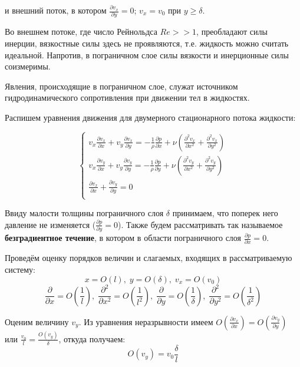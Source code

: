 и внешний поток, в котором $\frac{\partial v_x}{\partial y} = 0$; $v_x = v_0$ при $y \geq \delta$.

\bigskip
Во внешнем потоке, где число Рейнольдса $Re >> 1$, преобладают силы инерции, вязкостные силы здесь не проявляются, т.е. жидкость можно считать идеальной. Напротив, в пограничном слое силы вязкости и инерционные силы соизмеримы.

Явления, происходящие в пограничном слое, служат источником гидродинамического сопротивления при движении тел в жидкостях.

\bigskip
Распишем уравнения движения для двумерного стационарного потока жидкости:

\begin{equation}
  \begin{cases}
    v_x\frac{\partial v_x}{\partial x} + v_y\frac{\partial v_x}{\partial y} = -\frac{1}{\rho} \frac{\partial p}{\partial x} + \nu (\frac{\partial^2 v_x}{\partial x^2} + \frac{\partial^2 v_x}{\partial y^2}) \\

    v_x\frac{\partial v_y}{\partial x} + v_y\frac{\partial v_y}{\partial y} = -\frac{1}{\rho} \frac{\partial p}{\partial y} + \nu (\frac{\partial^2 v_y}{\partial x^2} + \frac{\partial^2 v_y}{\partial y^2}) \\

    \frac{\partial v_x}{\partial x} + \frac{\partial v_y}{\partial y} = 0                                                                                                                                     \\
  \end{cases}
\end{equation}

Ввиду малости толщины пограничного слоя $\delta$ принимаем, что поперек него давление не изменяется ($\frac{\partial p}{\partial y} = 0$). Также будем рассматривать так называемое \textbf{безградиентное течение}, в котором в области пограничного слоя $\frac{\partial p}{\partial x} = 0$.

Проведём оценку порядков величин и слагаемых, входящих в рассматриваемую систему:
$$x = O(l),\; y = O(\delta),\; v_x = O(v_0)$$
$$\frac{\partial}{\partial x} = O(\frac{1}{l}),\; \frac{\partial^2}{\partial x^2} = O(\frac{1}{l^2}),\; \frac{\partial}{\partial y} = O(\frac{1}{\delta}),\; \frac{\partial^2}{\partial y^2} = O(\frac{1}{\delta^2})$$

Оценим величину $v_y$. Из уравнения неразрывности имеем $O(\frac{\partial v_x}{\partial x}) = O(\frac{\partial v_y}{\partial y})$ или $\frac{v_0}{l} = \frac{O(v_y)}{\delta}$, откуда получаем:
$$O(v_y) = v_0\frac{\delta}{l}$$

